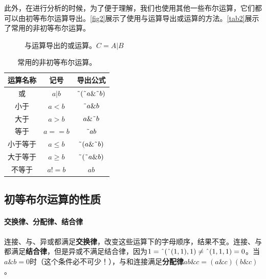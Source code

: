 此外，在进行分析的时候，为了便于理解，我们也使用其他一些布尔运算，它们都可以由初等布尔运算导出。\autoref{fig2}展示了使用与运算导出或运算的方法。\autoref{tab2}展示了常用的非初等布尔运算。

\begin{figure}[!ht]
  \centering
  \caption{与运算导出的或运算。$C=A|B$}
  \label{fig2}
\end{figure}

\begin{table}[!ht]
  \centering
  \begin{tabular}{|c|c|c|}
    \hline
    运算名称 & 记号     & 导出公式 \\\hline
    或       & $a|b$    & $\textrm{\~{}}(\textrm{\~{}}a\&\textrm{\~{}}b)$ \\\hline
    小于     & $a<b$    & $\textrm{\~{}}a\&b$ \\\hline
    大于     & $a>b$    & $a\&\textrm{\~{}}b$ \\\hline
    等于     & $a==b$   & $\textrm{\~{}}ab$ \\\hline
    小于等于 & $a\le b$ & $\textrm{\~{}}(a\&\textrm{\~{}}b)$ \\\hline
    大于等于 & $a\ge b$ & $\textrm{\~{}}(\textrm{\~{}}a\&b)$ \\\hline
    不等于   & $a!=b$   & $ab$ \\\hline
  \end{tabular}
  \caption{常用的非初等布尔运算。}\label{tab2}
\end{table}

\subsection{初等布尔运算的性质}\label{sec9317}

\paragraph*{交换律、分配律、结合律}

连接、与、异或都满足\textbf{交换律}，改变这些运算下的字母顺序，结果不变。连接、与都满足\textbf{结合律}，但是异或不满足结合律，因为$1=\textrm{\^{}}(\textrm{\^{}}(1,1),1)\ne \textrm{\^{}}(1,1,1)=0$。当$a\&b=0$时（这个条件必不可少！），与和连接满足\textbf{分配律}$ab\&c=(a\&c)(b\&c)$。

